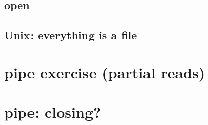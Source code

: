 

\subsection{open}



\subsection{Unix: everything is a file}



\section{pipe exercise (partial reads)}


\section{pipe: closing?}


